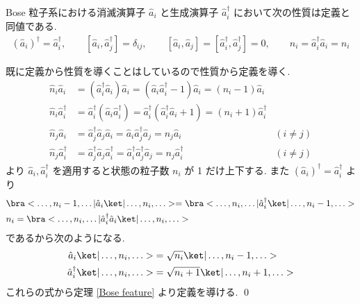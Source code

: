 \documentclass[uplatex,dvipdfmx,a4paper,11pt]{jlreq}
\makeatletter
\numberwithin{equation}{section}
\theoremstyle{definition}
\renewenvironment{proof}[1][\proofname]{\par
  \normalfont
  \topsep6\p@\@plus6\p@ \trivlist
  \item[\hskip\labelsep{\bfseries #1}\@addpunct{\bfseries}]\ignorespaces\quad\par
}{%
  \qed\endtrivlist\@endpefalse
}
\renewcommand\proofname{証明}
\makeatother
\begin{document}
\begin{theorem}[Q21-41]
  Bose 粒子系における消滅演算子 $\hat{a}_i$ と生成演算子 $\hat{a}_i^\dagger$ において次の性質は定義と同値である.
  \begin{align}
    (\hat{a}_i)^\dagger = \hat{a}_i^\dagger, \qquad [\hat{a}_i, \hat{a}_j^\dagger] = \delta_{ij}, \qquad [\hat{a}_i, \hat{a}_j] = [\hat{a}_i^\dagger, \hat{a}_j^\dagger] = 0, \qquad \hat{n}_i = \hat{a}_i^\dagger\hat{a}_i = n_i
  \end{align}
\end{theorem}
\begin{proof}
  既に定義から性質を導くことはしているので性質から定義を導く.
  \begin{align}
    \hat{n}_i\hat{a}_i         & = (\hat{a}_i^\dagger\hat{a}_i)\hat{a}_i = (\hat{a}_i\hat{a}_i^\dagger - 1)\hat{a}_i = (n_i - 1)\hat{a}_i                                     \\
    \hat{n}_i\hat{a}_i^\dagger & = \hat{a}_i^\dagger(\hat{a}_i\hat{a}_i^\dagger) = \hat{a}_i^\dagger(\hat{a}_i^\dagger\hat{a}_i + 1) = (n_i + 1)\hat{a}_i^\dagger             \\
    \hat{n}_j\hat{a}_i         & = \hat{a}_j^\dagger\hat{a}_j\hat{a}_i = \hat{a}_i\hat{a}_j^\dagger\hat{a}_j = n_j\hat{a}_i                                       & (i\neq j) \\
    \hat{n}_j\hat{a}_i^\dagger & = \hat{a}_j^\dagger\hat{a}_j\hat{a}_i^\dagger = \hat{a}_i^\dagger\hat{a}_j^\dagger\hat{a}_j = n_j\hat{a}_i^\dagger               & (i\neq j)
  \end{align}
  より $\hat{a}_i, \hat{a}_i^\dagger$ を適用すると状態の粒子数 $n_i$ が 1 だけ上下する. また $(\hat{a}_i)^\dagger = \hat{a}_i^\dagger$ より
  \begin{align}
     & \bra<\ldots,n_i-1,\ldots|\hat{a}_i\ket|\ldots,n_i,\ldots> = \bra<\ldots,n_i,\ldots|\hat{a}_i^\dagger\ket|\ldots,n_i-1,\ldots> \\
     & n_i = \bra<\ldots,n_i,\ldots|\hat{a}_i^\dagger\hat{a}_i\ket|\ldots,n_i,\ldots>
  \end{align}
  であるから次のようになる.
  \begin{align}
    \hat{a}_i\ket|\ldots,n_i,\ldots>         & = \sqrt{n_i}\ket|\ldots,n_i-1,\ldots>     \\
    \hat{a}_i^\dagger\ket|\ldots,n_i,\ldots> & = \sqrt{n_i + 1}\ket|\ldots,n_i+1,\ldots>
  \end{align}
  これらの式から定理 \ref{Bose feature} より定義を導ける.
\end{proof}
\end{document}
